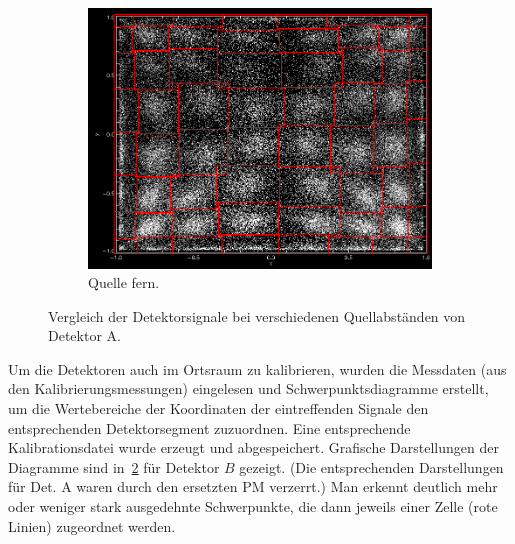 \documentclass[slug=PET, room=Andreas-Schubert-Bau\,\ 424A, supervisor=Carsten\ Bittrich, coursedate=10.\ 01.\ 2020]{../../Lab_Report_LaTeX/lab_report}
\begin{document}
\begin{figure}[h!]
\begin{subfigure}{0.32\textwidth}
    \includegraphics[width=.9\textwidth]{../messungen/kalib/vergleich_mitte_fern_FERN.png}
    \caption{Quelle fern.}
    \label{fig:ab-fern}
  \end{subfigure}
  \caption{Vergleich der Detektorsignale bei verschiedenen
    Quellabständen von Detektor A.}
  \label{fig:abstand}
\end{figure}

Um die Detektoren auch im Ortsraum zu kalibrieren, wurden die Messdaten
(aus den Kalibrierungsmessungen) eingelesen und Schwerpunktsdiagramme
erstellt, um die Wertebereiche der Koordinaten der eintreffenden
Signale den entsprechenden Detektorsegment zuzuordnen. Eine
entsprechende Kalibrationsdatei wurde erzeugt und
abgespeichert. Grafische Darstellungen der Diagramme sind
in~\ref{fig:abstand} f\"ur Detektor \(B\) gezeigt. (Die entsprechenden
Darstellungen f\"ur Det. A waren durch den ersetzten PM verzerrt.)
Man erkennt deutlich mehr oder weniger stark ausgedehnte
Schwerpunkte, die dann jeweils einer Zelle (rote Linien) zugeordnet
werden.
\end{document}

